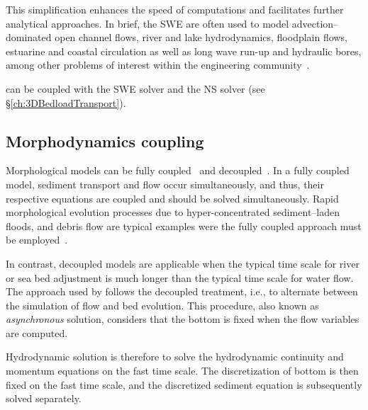 This simplification enhances the speed of computations and
facilitates further analytical approaches. In brief, the SWE are often
used to model advection--dominated open channel flows, river and lake
hydrodynamics, floodplain flows, estuarine and coastal circulation as well
as long wave run-up and hydraulic bores, among
other problems of interest within the engineering community~\cite{Vreugdenhil:94}. 

\sisyphe{} can be coupled with the SWE solver  and the NS solver  (see \S\ref{ch:3DBedloadTransport}). 

\subsection{Morphodynamics coupling}
Morphological models can be fully coupled~\cite{cao02} and decoupled~\cite{vriend87}. In a fully coupled model, sediment
transport and flow occur simultaneously, and thus, their respective
equations are coupled and should be solved simultaneously. Rapid morphological evolution processes due
to hyper-concentrated sediment--laden floods, and debris flow are typical
examples were the fully coupled approach must be employed~\cite{Frac02}.

In contrast, decoupled models are applicable when the typical time scale for river or sea bed adjustment 
is much longer than the typical time scale for water flow. The approach used by \sisyphe{} follows the decoupled treatment, i.e., to alternate between the simulation of flow and bed evolution. This procedure, also known as \textit{asynchronous} solution, considers that the bottom is fixed when the flow variables are computed.

Hydrodynamic solution is therefore to solve the hydrodynamic continuity and momentum equations on the fast time scale. The discretization of bottom is then fixed on the fast time scale,
and the discretized sediment equation is subsequently solved separately.


